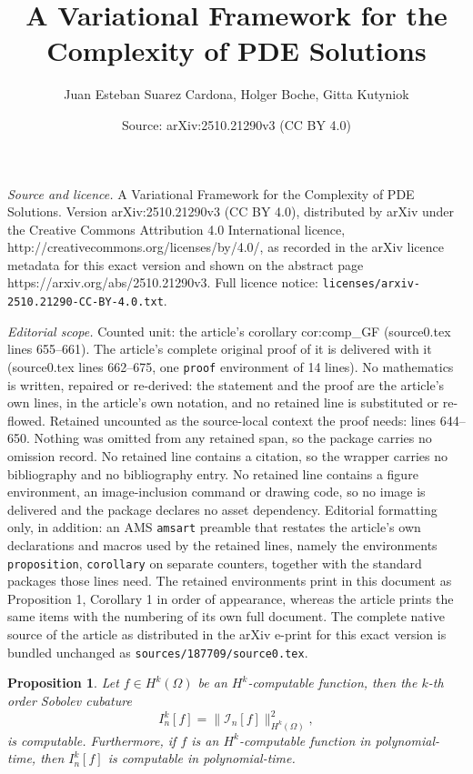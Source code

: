 \documentclass[10pt,a4paper]{amsart}
\title{A Variational Framework for the Complexity of PDE Solutions}
\author{Juan Esteban Suarez Cardona, Holger Boche, Gitta Kutyniok}
\date{Source: arXiv:2510.21290v3 (CC BY 4.0)}
\newtheorem{proposition}{Proposition}
\begin{document}
\maketitle

\noindent\emph{Source and licence.} A Variational Framework for the Complexity of PDE Solutions. Version arXiv:2510.21290v3 (CC BY 4.0), distributed by arXiv under the Creative Commons Attribution 4.0 International licence, http://creativecommons.org/licenses/by/4.0/, as recorded in the arXiv licence metadata for this exact version and shown on the abstract page https://arxiv.org/abs/2510.21290v3. Full licence notice: \texttt{licenses/arxiv-2510.21290-CC-BY-4.0.txt}.\par\smallskip

\noindent\textit{Editorial scope.} Counted unit: the article's corollary cor:comp\_GF (source0.tex lines 655--661). The article's complete original proof of it is delivered with it (source0.tex lines 662--675, one \texttt{proof} environment of 14 lines). No mathematics is written, repaired or re-derived: the statement and the proof are the article's own lines, in the article's own notation, and no retained line is substituted or re-flowed.  Retained uncounted as the source-local context the proof needs: lines 644--650.  Nothing was omitted from any retained span, so the package carries no omission record.  No retained line contains a citation, so the wrapper carries no bibliography and no bibliography entry.  No retained line contains a figure environment, an image-inclusion command or drawing code, so no image is delivered and the package declares no asset dependency.  Editorial formatting only, in addition: an AMS \texttt{amsart} preamble that restates the article's own declarations and macros used by the retained lines, namely the environments \texttt{proposition}, \texttt{corollary} on separate counters, together with the standard packages those lines need.  The retained environments print in this document as Proposition 1, Corollary 1 in order of appearance, whereas the article prints the same items with the numbering of its own full document.  The complete native source of the article as distributed in the arXiv e-print for this exact version is bundled unchanged as \texttt{sources/187709/source0.tex}.
\begin{proposition}\label{prop:comp_cub}
Let $f\in H^k(\Omega)$ be an $H^k$-computable function, then the $k$-th order Sobolev cubature
$$
I^k_n[f]=\|\mathcal{I}_n[f]\|_{H^k(\Omega)}^2,
$$
is computable. Furthermore, if $f$ is an $H^k$-computable function in polynomial-time, then $I^k_n[f]$ is computable in polynomial-time.
\end{proposition}
\end{document}
